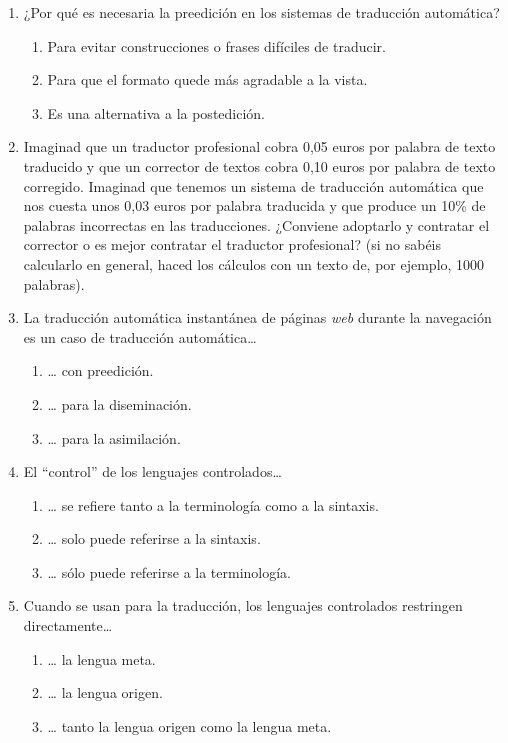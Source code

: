 \begin{enumerate}
\item ¿Por qué es necesaria la preedición en los sistemas de traducción automática? \begin{enumerate} \item Para evitar construcciones o frases difíciles de traducir. \item Para que el formato quede más agradable a la vista. \item Es una alternativa a la postedición. \end{enumerate} 

\item Imaginad que un traductor profesional cobra 0,05 euros por palabra de texto traducido y que un corrector de textos cobra 0,10 euros por palabra de texto corregido. Imaginad que tenemos un sistema de traducción automática que nos cuesta unos 0,03 euros por palabra traducida y que produce un 10\% de palabras incorrectas en las traducciones. ¿Conviene adoptarlo y contratar el corrector o es mejor contratar el traductor profesional? (si no sabéis calcularlo en general, haced los cálculos con un texto de, por ejemplo, 1000 palabras). 

\item La traducción automática instantánea de páginas \emph{web} durante la navegación es un caso de traducción automática{\ldots} \begin{enumerate} \item {\ldots} con preedición. \item {\ldots} para la diseminación. \item {\ldots} para la asimilación. \end{enumerate} 

\item El ``control'' de los lenguajes controlados{\ldots} \begin{enumerate} \item {\ldots} se refiere tanto a la terminología como a la sintaxis. \item {\ldots} solo puede referirse a la sintaxis. \item {\ldots} sólo puede referirse a la terminología. \end{enumerate} 

\item Cuando se usan para la traducción, los lenguajes controlados restringen directamente{\ldots} \begin{enumerate} \item {\ldots} la lengua meta. \item {\ldots} la lengua origen. \item {\ldots} tanto la lengua origen como la lengua meta. \end{enumerate} 


\end{enumerate}
